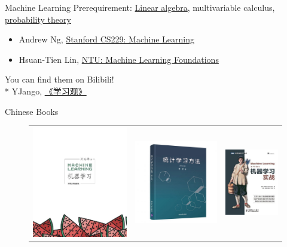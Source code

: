\documentclass{../TexTemplate/myslide}
\begin{document}
\begin{frame}{Machine Learning}
Prerequirement: \href{http://cs229.stanford.edu/section/cs229-linalg.pdf}{Linear algebra}, multivariable calculus, \href{http://cs229.stanford.edu/section/cs229-prob.pdf}{probability theory}
\begin{itemize}
	\item Andrew Ng, \href{http://cs229.stanford.edu/}{Stanford CS229: Machine Learning}
	\item Hsuan-Tien Lin, \href{https://www.csie.ntu.edu.tw/~htlin/course/mlfound19fall/}{NTU: Machine Learning Foundations}
\end{itemize}
You can find them on Bilibili!\\\bigskip
* YJango, \href{https://space.bilibili.com/344849038/channel/detail?cid=54015}{《学习观》}
\end{frame}

\begin{frame}{Chinese Books}
\begin{figure}
\centering
\begin{tabular}{ccc}
\href{https://book.douban.com/subject/26708119/}{\includegraphics[width=0.3\linewidth]{fig/watermelon_book.jpg}} &
\href{https://item.jd.com/47384022706.html}{\includegraphics[width=0.32\linewidth]{fig/statistical_ml.jpg}}&
\href{https://book.douban.com/subject/24703171/}{\includegraphics[width=0.25\linewidth]{fig/ml_in_action.jpg}}
\end{tabular}
\end{figure}
\end{frame}
\end{document}
